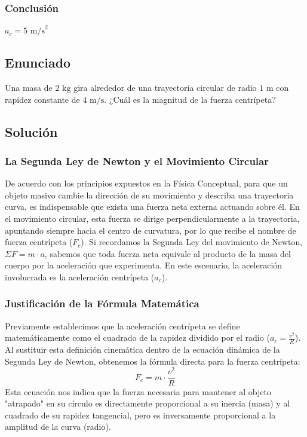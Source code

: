 \documentclass{article}
\begin{document}
\subsubsection*{Conclusión}
$a_c = 5 \text{ m/s}^2$

\newpage

\subsection*{Enunciado}
Una masa de $2 \text{ kg}$ gira alrededor de una trayectoria circular de radio $1 \text{ m}$ con rapidez constante de $4 \text{ m/s}$. ¿Cuál es la magnitud de la fuerza centrípeta?

\subsection*{Solución}

\subsubsection*{La Segunda Ley de Newton y el Movimiento Circular}
De acuerdo con los principios expuestos en la Física Conceptual, para que un objeto masivo cambie la dirección de su movimiento y describa una trayectoria curva, es indispensable que exista una fuerza neta externa actuando sobre él. En el movimiento circular, esta fuerza se dirige perpendicularmente a la trayectoria, apuntando siempre hacia el centro de curvatura, por lo que recibe el nombre de fuerza centrípeta ($F_c$). Si recordamos la Segunda Ley del movimiento de Newton, $\Sigma F = m \cdot a$, sabemos que toda fuerza neta equivale al producto de la masa del cuerpo por la aceleración que experimenta. En este escenario, la aceleración involucrada es la aceleración centrípeta ($a_c$).

\subsubsection*{Justificación de la Fórmula Matemática}
Previamente establecimos que la aceleración centrípeta se define matemáticamente como el cuadrado de la rapidez dividido por el radio ($a_c = \frac{v^2}{R}$). Al sustituir esta definición cinemática dentro de la ecuación dinámica de la Segunda Ley de Newton, obtenemos la fórmula directa para la fuerza centrípeta:
$$F_c = m \cdot \frac{v^2}{R}$$
Esta ecuación nos indica que la fuerza necesaria para mantener al objeto "atrapado" en su círculo es directamente proporcional a su inercia (masa) y al cuadrado de su rapidez tangencial, pero es inversamente proporcional a la amplitud de la curva (radio).
\end{document}
